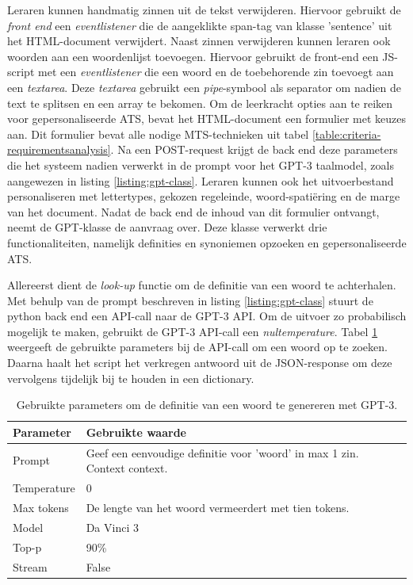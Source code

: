Leraren kunnen handmatig zinnen uit de tekst verwijderen. Hiervoor gebruikt de \textit{front end} een \textit{eventlistener} die de aangeklikte span-tag van klasse 'sentence' uit het HTML-document verwijdert. Naast zinnen verwijderen kunnen leraren ook woorden aan een woordenlijst toevoegen. Hiervoor gebruikt de front-end een JS-script met een \textit{eventlistener} die een woord en de toebehorende zin toevoegt aan een \textit{textarea}. Deze \textit{textarea} gebruikt een \textit{pipe}-symbool als separator om nadien de text te splitsen en een array te bekomen. Om de leerkracht opties aan te reiken voor gepersonaliseerde ATS, bevat het HTML-document een formulier met keuzes aan. Dit formulier bevat alle nodige MTS-technieken uit tabel \ref{table:criteria-requirementsanalysis}. Na een POST-request krijgt de back end deze parameters die het systeem nadien verwerkt in de prompt voor het GPT-3 taalmodel, zoals aangewezen in listing \ref{listing:gpt-class}. Leraren kunnen ook het uitvoerbestand personaliseren met lettertypes, gekozen regeleinde, woord-spatiëring en de marge van het document. Nadat de back end de inhoud van dit formulier ontvangt, neemt de GPT-klasse de aanvraag over. Deze klasse verwerkt drie functionaliteiten, namelijk definities en synoniemen opzoeken en gepersonaliseerde ATS.

\medspace

Allereerst dient de \textit{look-up} functie om de definitie van een woord te achterhalen. Met behulp van de prompt beschreven in listing \ref{listing:gpt-class} stuurt de python back end een API-call naar de GPT-3 API. Om de uitvoer zo probabilisch mogelijk te maken, gebruikt de GPT-3 API-call een \textit{nultemperature}. Tabel \ref{table:gpt-3-look-up} weergeeft de gebruikte parameters bij de API-call om een woord op te zoeken. Daarna haalt het script het verkregen antwoord uit de JSON-response om deze vervolgens tijdelijk bij te houden in een dictionary.

\begin{center}
	\begin{table}[H]
		\begin{tabular}{| m{5cm}| m{8cm} |}
			\hline
			Parameter & Gebruikte waarde \\ \hline
			Prompt & Geef een eenvoudige definitie voor '{woord}' in max 1 zin. Context {context}. \\ \hline
			Temperature & 0 \\ \hline
			Max tokens & De lengte van het woord vermeerdert met tien tokens. \\ \hline
			Model & Da Vinci 3 \\ \hline
			Top-p & 90\% \\ \hline
			Stream & False \\ \hline
		\end{tabular}
	\caption{Gebruikte parameters om de definitie van een woord te genereren met GPT-3.}
	\label{table:gpt-3-look-up}
	\end{table}
\end{center}


